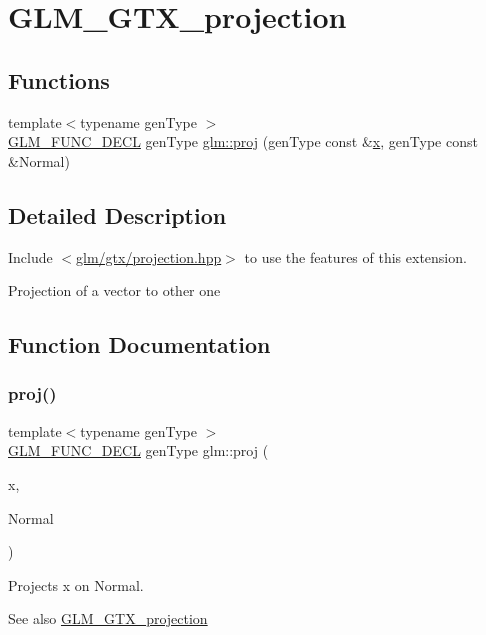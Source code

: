 \hypertarget{group__gtx__projection}{}\section{G\+L\+M\+\_\+\+G\+T\+X\+\_\+projection}
\label{group__gtx__projection}
\subsection*{Functions}
\begin{DoxyCompactItemize}
\item 
{\footnotesize template$<$typename gen\+Type $>$ }\\\hyperlink{setup_8hpp_ab2d052de21a70539923e9bcbf6e83a51}{G\+L\+M\+\_\+\+F\+U\+N\+C\+\_\+\+D\+E\+CL} gen\+Type \hyperlink{group__gtx__projection_ga58384b7170801dd513de46f87c7fb00e}{glm\+::proj} (gen\+Type const \&\hyperlink{_s_d_l__opengl_8h_ad0e63d0edcdbd3d79554076bf309fd47}{x}, gen\+Type const \&Normal)
\end{DoxyCompactItemize}


\subsection{Detailed Description}
Include $<$\hyperlink{projection_8hpp}{glm/gtx/projection.\+hpp}$>$ to use the features of this extension.

Projection of a vector to other one 

\subsection{Function Documentation}
\mbox{\label{group__gtx__projection_ga58384b7170801dd513de46f87c7fb00e}} 
\subsubsection{\texorpdfstring{proj()}{proj()}}
{\footnotesize\ttfamily template$<$typename gen\+Type $>$ \\
\hyperlink{setup_8hpp_ab2d052de21a70539923e9bcbf6e83a51}{G\+L\+M\+\_\+\+F\+U\+N\+C\+\_\+\+D\+E\+CL} gen\+Type glm\+::proj (\begin{DoxyParamCaption}\item[{gen\+Type const \&}]{x,  }\item[{gen\+Type const \&}]{Normal }\end{DoxyParamCaption})}

Projects x on Normal.

\begin{DoxySeeAlso}{See also}
\hyperlink{group__gtx__projection}{G\+L\+M\+\_\+\+G\+T\+X\+\_\+projection} 
\end{DoxySeeAlso}

